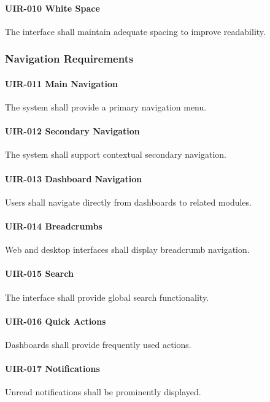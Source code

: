 \paragraph{UIR-010 White Space}
The interface shall maintain adequate spacing to improve readability.


\subsubsection*{Navigation Requirements}

\paragraph{UIR-011 Main Navigation}
The system shall provide a primary navigation menu.

\paragraph{UIR-012 Secondary Navigation}
The system shall support contextual secondary navigation.

\paragraph{UIR-013 Dashboard Navigation}
Users shall navigate directly from dashboards to related modules.

\paragraph{UIR-014 Breadcrumbs}
Web and desktop interfaces shall display breadcrumb navigation.

\paragraph{UIR-015 Search}
The interface shall provide global search functionality.

\paragraph{UIR-016 Quick Actions}
Dashboards shall provide frequently used actions.

\paragraph{UIR-017 Notifications}
Unread notifications shall be prominently displayed.

